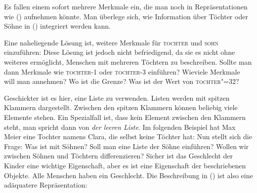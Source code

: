 Es fallen einem sofort mehrere Merkmale ein, die man noch in Repräsentationen wie ()
aufnehmen könnte. Man überlege sich, wie Information über Töchter oder Söhne in 
() integriert werden kann.

Eine naheliegende Lösung ist, weitere Merkmale für \textsc{tochter} und \textsc{sohn}
einzuführen:
\ea
{}
\z
Diese Lösung ist jedoch nicht befriedigend, da sie es nicht ohne weiteres
ermöglicht, Menschen mit mehreren Töchtern zu beschreiben. Sollte man dann
Merkmale wie \textsc{tochter-1} oder \textsc{tochter-3} einführen?
\ea
{}
\z
Wieviele Merkmale will man annehmen? Wo ist die Grenze?
Was ist der Wert von \textsc{tochter"=32}?

Geschickter ist es hier, eine Liste zu verwenden. Listen werden mit spitzen
Klammern dargestellt. Zwischen den spitzen Klammern können beliebig
viele Elemente stehen. Ein Spezialfall ist, dass kein Element zwischen den
Klammern steht, man spricht dann von \emph{der leeren Liste}. Im folgenden Beispiel
hat Max Meier eine Tochter namens Clara, die selbst keine Töchter hat:
\ea
{}
\z
Nun stellt sich die Frage: Was ist mit Söhnen? Soll man eine Liste der Söhne einführen?
Wollen wir zwischen Söhnen und Töchtern differenzieren? 
Sicher ist das Geschlecht der Kinder eine wichtige Eigenschaft, aber es ist eine Eigenschaft
der beschriebenen Objekte. Alle Menschen haben ein Geschlecht. Die Beschreibung in ()
ist also eine adäquatere Repräsentation:

